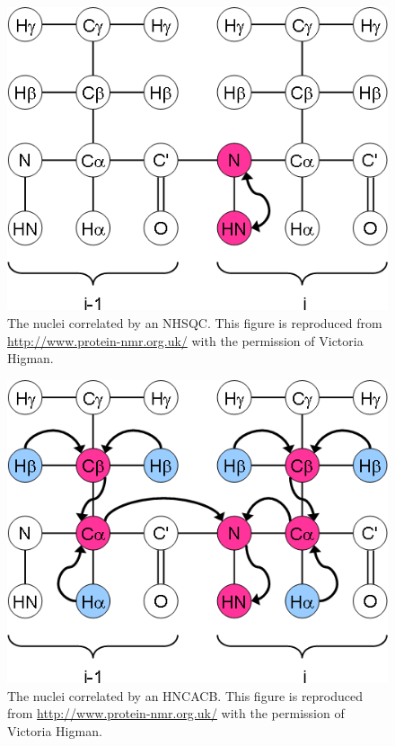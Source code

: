 \begin{figure}
  \includegraphics[scale=0.75]{figures/ccpn_nhsqc}
  \caption[The nuclei correlated by an NHSQC.]
          {The nuclei correlated by an NHSQC.
           This figure is reproduced from \url{http://www.protein-nmr.org.uk/}
           with the permission of Victoria Higman.}
  \label{ccpn_nhsqc}
\end{figure}

\begin{figure}
  \includegraphics[scale=0.75]{figures/ccpn_hncacb}
  \caption[The nuclei correlated by an HNCACB.]
          {The nuclei correlated by an HNCACB.
           This figure is reproduced from \url{http://www.protein-nmr.org.uk/}
           with the permission of Victoria Higman.}
  \label{ccpn_hncacb}
\end{figure}

